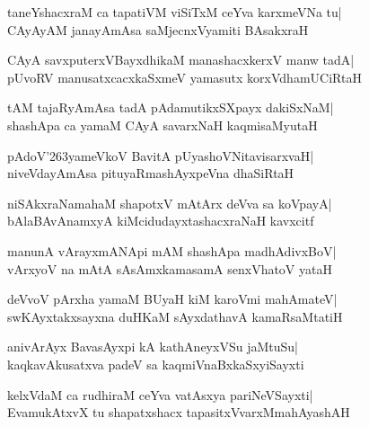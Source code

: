 \documentclass[twoside,12pt,openright]{book}
\def\S{\char'263}
\newcounter{shloka}[chapter]
\begin{document}
\begin{shloka}%
taneYshacxraM ca tapatiVM viSiTxM ceYva karxmeVNa tu|\\
CAyAyAM janayAmAsa saMjecnxVyamiti BAsakxraH
\end{shloka}

\begin{shloka}%
CAyA savxputerxVBayxdhikaM manashacxkerxV manw tadA|\\
pUvoRV manusatxcacxkaSxmeV yamasutx korxVdhamUCiRtaH
\end{shloka}

\begin{shloka}%
tAM tajaRyAmAsa tadA pAdamutikxSXpayx dakiSxNaM|\\
shashApa ca yamaM CAyA savarxNaH kaqmisaMyutaH
\end{shloka}

\begin{shloka}%
pAdoV\S yameVkoV BavitA pUyashoVNitavisarxvaH|\\
niveVdayAmAsa pituyaRmashAyxpeVna dhaSiRtaH
\end{shloka}

\begin{shloka}%
niSAkxraNamahaM shapotxV mAtArx deVva sa koVpayA|\\
bAlaBAvAnamxyA kiMcidudayxtashacxraNaH kavxcitf
\end{shloka}

\begin{shloka}%
manunA vArayxmANApi mAM shashApa madhAdivxBoV|\\
vArxyoV na mAtA sAsAmxkamasamA senxVhatoV yataH
\end{shloka}

\begin{shloka}%
deVvoV pArxha yamaM BUyaH kiM karoVmi mahAmateV|\\
swKAyxtakxsayxna duHKaM sAyxdathavA kamaRsaMtatiH
\end{shloka}

\begin{shloka}%
anivArAyx BavasAyxpi kA kathAneyxVSu jaMtuSu|\\
kaqkavAkusatxva padeV sa kaqmiVnaBxkaSxyiSayxti
\end{shloka}

\begin{shloka}%
kelxVdaM ca rudhiraM ceYva vatAsxya pariNeVSayxti|\\
EvamukAtxvX tu shapatxshacx tapasitxVvarxMmahAyashAH
\end{shloka}
\end{document}
